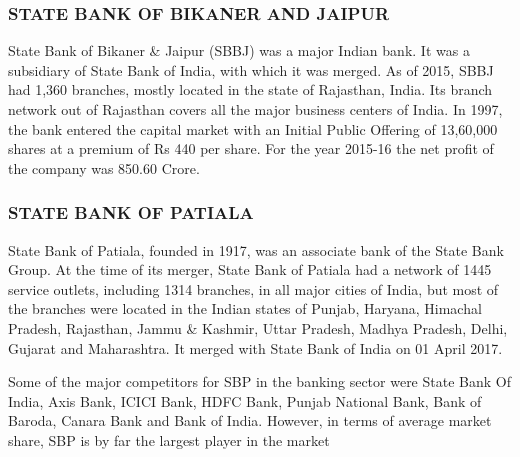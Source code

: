 \documentclass[a4paper, 12pt]{extarticle}
\begin{document}
{\subsubsection{STATE BANK OF BIKANER AND JAIPUR}
State Bank of Bikaner \& Jaipur (SBBJ) was a major Indian bank. It was a subsidiary of State Bank of India, with which it was merged. As of 2015, SBBJ had 1,360 branches, mostly located in the state of Rajasthan, India. Its branch network out of Rajasthan covers all the major business centers of India. In 1997, the bank entered the capital market with an Initial Public Offering of 13,60,000 shares at a premium of Rs 440 per share. For the year 2015-16 the net profit of the company was 850.60 Crore.

\subsubsection{STATE BANK OF PATIALA}
State Bank of Patiala, founded in 1917, was an associate bank of the State Bank Group. At the time of its merger, State Bank of Patiala had a network of 1445 service outlets, including 1314 branches, in all major cities of India, but most of the branches were located in the Indian states of Punjab, Haryana, Himachal Pradesh, Rajasthan, Jammu \& Kashmir, Uttar Pradesh, Madhya Pradesh, Delhi, Gujarat and Maharashtra. It merged with State Bank of India on 01 April 2017.

Some of the major competitors for SBP in the banking sector were State Bank Of India, Axis Bank, ICICI Bank, HDFC Bank, Punjab National Bank, Bank of Baroda, Canara Bank and Bank of India. However, in terms of average market share, SBP is by far the largest player in the market
}
\end{document}

